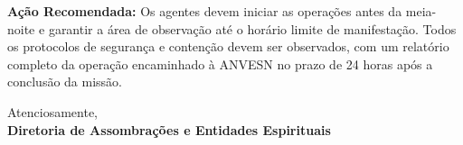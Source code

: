 {\begin{minipage}{0.9\textwidth}
\vspace{0.3cm}
\noindent
\textbf{Ação Recomendada:}
Os agentes devem iniciar as operações antes da meia-noite e garantir a área de observação até o horário limite de manifestação. Todos os protocolos de segurança e contenção devem ser observados, com um relatório completo da operação encaminhado à ANVESN no prazo de 24 horas após a conclusão da missão.

\vspace{0.3cm}
\noindent
Atenciosamente, \\
\vspace{0.3cm}
\textbf{Diretoria de Assombrações e Entidades Espirituais} \\


\end{minipage}
}


